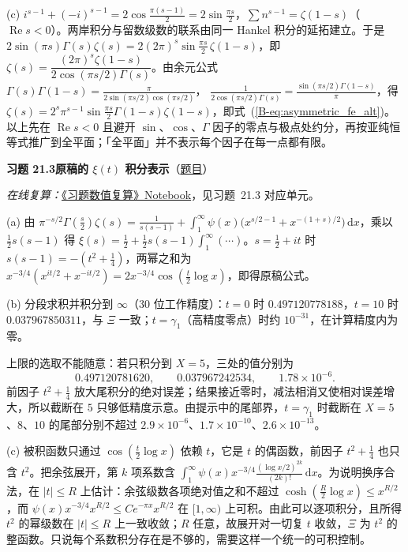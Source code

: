\documentclass[11pt,a4paper]{article}
\newcommand{\dd}{\,\mathrm{d}}
\renewcommand{\Re}{\operatorname{Re}}
\newcommand{\bref}[1]{\ref*{B-#1}}
\newcommand{\Sol}[2]{%
  \par\addvspace{1.2em}\noindent
  \hypertarget{s:#1}{}\textbf{习题 #1\quad #2}\hfill{\small（\hyperlink{q:#1}{题目}）}\par
  \nopagebreak\smallskip}
\begin{document}
(c) $i^{s-1}+(-i)^{s-1}=2\cos\frac{\pi(s-1)}2=2\sin\frac{\pi s}2$，$\sum n^{s-1}=\zeta(1-s)$（$\Re s<0$）。两岸积分与留数级数的联系由同一 Hankel 积分的延拓建立。于是
$2\sin(\pi s)\Gamma(s)\zeta(s)=2(2\pi)^s\sin\frac{\pi s}2\,\zeta(1-s)$，即
$\zeta(s)=\dfrac{(2\pi)^s\zeta(1-s)}{2\cos(\pi s/2)\Gamma(s)}$。由余元公式 $\Gamma(s)\Gamma(1-s)=\frac{\pi}{2\sin(\pi s/2)\cos(\pi s/2)}$，
$\frac1{2\cos(\pi s/2)\Gamma(s)}=\frac{\sin(\pi s/2)\Gamma(1-s)}{\pi}$，得
$\zeta(s)=2^s\pi^{s-1}\sin\frac{\pi s}2\Gamma(1-s)\zeta(1-s)$，即式~(\bref{eq:asymmetric_fe_alt})。以上先在 $\Re s<0$ 且避开 $\sin$、$\cos$、$\Gamma$ 因子的零点与极点处约分，再按亚纯恒等式推广到全平面；「全平面」并不表示每个因子在每一点都有限。

\Sol{21.3}{原稿的 $\xi(t)$ 积分表示}
\emph{在线复算：}\href{https://colab.research.google.com/github/lichengtong123/lichengtong-RH/blob/main/\%E4\%B9\%A0\%E9\%A2\%98\%E4\%B8\%8E\%E8\%A7\%A3\%E7\%AD\%94/\%E4\%B9\%A0\%E9\%A2\%98\%E6\%95\%B0\%E5\%80\%BC\%E5\%A4\%8D\%E7\%AE\%97.ipynb}{《习题数值复算》Notebook}，见习题~21.3 对应单元。

(a) 由 $\pi^{-s/2}\Gamma(\frac s2)\zeta(s)=\frac1{s(s-1)}+\int_1^\infty\psi(x)\bigl(x^{s/2-1}+x^{-(1+s)/2}\bigr)\dd x$，乘以 $\frac12s(s-1)$ 得 $\xi(s)=\frac12+\frac12s(s-1)\int_1^\infty(\cdots)$。$s=\frac12+it$ 时 $s(s-1)=-(t^2+\frac14)$，两幂之和为 $x^{-3/4}(x^{it/2}+x^{-it/2})=2x^{-3/4}\cos(\frac t2\log x)$，即得原稿公式。

(b) 分段求积并积分到 $\infty$（$30$ 位工作精度）：$t=0$ 时 $0.497120778188$，$t=10$ 时 $0.037967850311$，与 $\Xi$ 一致；$t=\gamma_1$（高精度零点）时约 $10^{-31}$，在计算精度内为零。

上限的选取不能随意：若只积分到 $X=5$，三处的值分别为
\[
  0.497120781620,\qquad 0.037967242534,\qquad 1.78\times10^{-6}.
\]
前因子 $t^2+\frac14$ 放大尾积分的绝对误差；结果接近零时，减法相消又使相对误差增大，所以截断在 $5$ 只够低精度示意。由提示中的尾部界，$t=\gamma_1$ 时截断在 $X=5$、$8$、$10$ 的尾部分别不超过 $2.9\times10^{-6}$、$1.7\times10^{-10}$、$2.6\times10^{-13}$。

(c) 被积函数只通过 $\cos(\frac t2\log x)$ 依赖 $t$，它是 $t$ 的偶函数，前因子 $t^2+\frac14$ 也只含 $t^2$。把余弦展开，第 $k$ 项系数含 $\int_1^\infty\psi(x)x^{-3/4}\frac{(\log x/2)^{2k}}{(2k)!}\dd x$。为说明换序合法，在 $|t|\le R$ 上估计：余弦级数各项绝对值之和不超过 $\cosh(\frac R2\log x)\le x^{R/2}$，而 $\psi(x)x^{-3/4}x^{R/2}\le Ce^{-\pi x}x^{R/2}$ 在 $[1,\infty)$ 上可积。由此可以逐项积分，且所得 $t^2$ 的幂级数在 $|t|\le R$ 上一致收敛；$R$ 任意，故展开对一切复 $t$ 收敛，$\Xi$ 为 $t^2$ 的整函数。只说每个系数积分存在是不够的，需要这样一个统一的可积控制。
\end{document}
